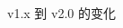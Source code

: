 \begin{frame}
\begin{figure}
\begin{columns}[c]
\begin{column}{0.2\textwidth}
      \end{column}
      \hfill
    \end{columns}
    \caption{\SJTUThesis{} v1.x 到 v2.0 的变化}
  \end{figure}
\end{frame}

